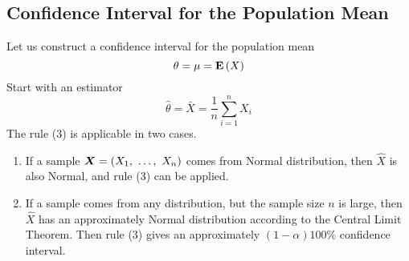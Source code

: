 \subsection{Confidence Interval for the Population Mean}
\label{subsec:conf-inter-for-the-pop-mean}

Let us construct a confidence interval for the population mean
\begin{equation*}
  \theta = \mu = \mathbf{E}\left(X\right)
\end{equation*}
\noindent Start with an estimator
\begin{equation*}
  \hat{\theta} = \bar{X} = \frac{1}{n} \sum_{i=1}^{n} X_i
\end{equation*}
\noindent The rule (3) is applicable in two cases.
\begin{enumerate}
  \item If a sample $\bs{X} = (X_1,\ \ldots,\ X_n)$ comes from Normal distribution, then $\hat{X}$ is also Normal, and rule (3) can be applied.
  \item If a sample comes from any distribution, but the sample size $n$ is large, then  $\hat{X}$ has an approximately Normal distribution according to the Central Limit Theorem. Then rule (3) gives an approximately $(1 - \alpha)100\%$ confidence interval.  
\end{enumerate}

